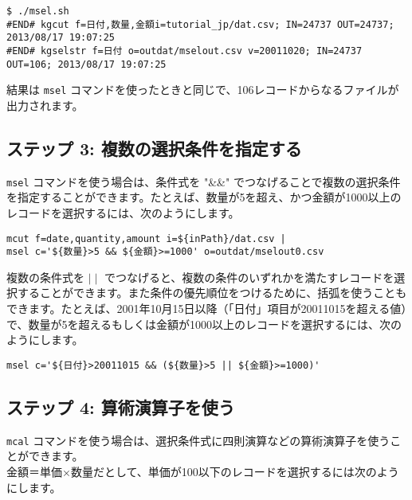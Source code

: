
\begin{verbatim}
$ ./msel.sh
#END# kgcut f=日付,数量,金額i=tutorial_jp/dat.csv; IN=24737 OUT=24737; 2013/08/17 19:07:25
#END# kgselstr f=日付 o=outdat/mselout.csv v=20011020; IN=24737 OUT=106; 2013/08/17 19:07:25
\end{verbatim}

\noindent
結果は \verb|msel| コマンドを使ったときと同じで、106レコードからなるファイルが出力されます。
\fi

\subsection{ステップ 3: 複数の選択条件を指定する}

\verb|msel| コマンドを使う場合は、条件式を "\&\&" でつなげることで複数の選択条件を指定することができます。たとえば、数量が5を超え、かつ金額が1000以上のレコードを選択するには、次のようにします。

\begin{verbatim}
mcut f=date,quantity,amount i=${inPath}/dat.csv |
msel c='${数量}>5 && ${金額}>=1000' o=outdat/mselout0.csv
\end{verbatim}

複数の条件式を $\mid \mid$ でつなげると、複数の条件のいずれかを満たすレコードを選択することができます。また条件の優先順位をつけるために、括弧を使うこともできます。たとえば、2001年10月15日以降（「日付」項目が20011015を超える値）で、数量が5を超えるもしくは金額が1000以上のレコードを選択するには、次のようにします。

\begin{verbatim}
msel c='${日付}>20011015 && (${数量}>5 || ${金額}>=1000)'
\end{verbatim}

\subsection{ステップ 4: 算術演算子を使う}

\verb|mcal| コマンドを使う場合は、選択条件式に四則演算などの算術演算子を使うことができます。\\

金額＝単価$\times$数量だとして、単価が100以下のレコードを選択するには次のようにします。

